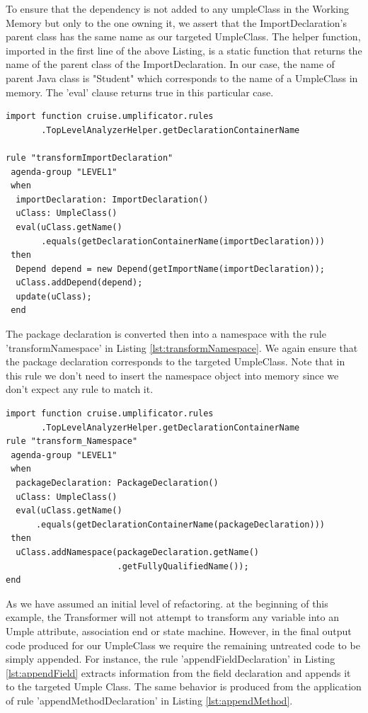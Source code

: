 To ensure that the dependency is not added to any umpleClass in the Working Memory but only to the one owning it, we assert that the ImportDeclaration's parent class has the same name as our targeted UmpleClass. The helper function, imported in the first line of the above Listing, is a static function that returns the name of the parent class of the ImportDeclaration. In our case, the name of parent Java class is "Student" which corresponds to the name of a UmpleClass in memory. The 'eval' clause returns true in this particular case.

\begin{lstlisting}[language={drools},label={lst:ruleImport}, caption=Rule transformImportDeclaration]
import function cruise.umplificator.rules
       .TopLevelAnalyzerHelper.getDeclarationContainerName
      
rule "transformImportDeclaration"
 agenda-group "LEVEL1" 
 when
  importDeclaration: ImportDeclaration()
  uClass: UmpleClass()
  eval(uClass.getName()
       .equals(getDeclarationContainerName(importDeclaration)))		
 then
  Depend depend = new Depend(getImportName(importDeclaration));
  uClass.addDepend(depend);
  update(uClass);
 end
\end{lstlisting}

The package declaration is converted then into a namespace with the rule 'transformNamespace' in Listing \ref{lst:transformNamespace}. We again ensure that the package declaration corresponds to the targeted UmpleClass. Note that in this rule we don't need to insert the namespace object into memory since we don't expect any rule to match it.

\begin{lstlisting}[language={drools},label={lst:transformNamespace}, caption=Rule transformNamespace]
import function cruise.umplificator.rules
       .TopLevelAnalyzerHelper.getDeclarationContainerName
rule "transform_Namespace"
 agenda-group "LEVEL1" 
 when
  packageDeclaration: PackageDeclaration()
  uClass: UmpleClass()
  eval(uClass.getName()
      .equals(getDeclarationContainerName(packageDeclaration)))	
 then
  uClass.addNamespace(packageDeclaration.getName()
                      .getFullyQualifiedName());
end
\end{lstlisting}

As we have assumed an initial level of refactoring. at the beginning of this example, the Transformer will not attempt to transform any variable into an Umple attribute, association end or state machine. However, in the final output code produced for our UmpleClass we require the remaining untreated code to be simply appended. For instance, the rule 'appendFieldDeclaration' in Listing \ref{lst:appendField} extracts information from the field declaration and appends it to the targeted Umple Class. The same behavior is produced from the application of rule 'appendMethodDeclaration' in Listing \ref{lst:appendMethod}.

